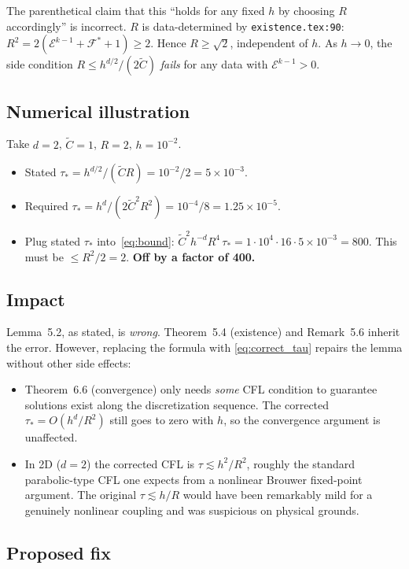 \documentclass[11pt]{article}
\newcommand{\dt}{\tau}
\newcommand{\Ctilde}{\widetilde{C}}
\begin{document}
The parenthetical claim that this ``holds for any fixed $h$ by
choosing $R$ accordingly'' is incorrect.  $R$ is data-determined by
\texttt{existence.tex:90}: $R^{2}=2(\mathcal{E}^{k-1}+\mathcal{F}^{*}+1)\ge 2$.
Hence $R\ge\sqrt{2}$, independent of $h$.  As $h\to 0$, the side
condition $R\le h^{d/2}/(2\Ctilde)$ \emph{fails} for any data with
$\mathcal{E}^{k-1}>0$.

\subsection*{Numerical illustration}

Take $d=2$, $\Ctilde=1$, $R=2$, $h=10^{-2}$.

\begin{itemize}
\item Stated $\dt_{*}=h^{d/2}/(\Ctilde R)=10^{-2}/2=5\times 10^{-3}$.
\item Required $\dt_{*}=h^{d}/(2\Ctilde^{2}R^{2})=10^{-4}/8=1.25\times 10^{-5}$.
\item Plug stated $\dt_{*}$ into~\eqref{eq:bound}:
\(
\Ctilde^{2}h^{-d}R^{4}\,\dt_{*} = 1\cdot 10^{4}\cdot 16\cdot 5\!\times\!10^{-3}=800.
\)
This must be $\le R^{2}/2=2$.  \textbf{Off by a factor of 400.}
\end{itemize}

\subsection*{Impact}

Lemma~5.2, as stated, is \emph{wrong}.  Theorem~5.4 (existence) and
Remark~5.6 inherit the error.  However, replacing the formula with
\eqref{eq:correct_tau} repairs the lemma without other side effects:
\begin{itemize}
\item Theorem~6.6 (convergence) only needs \emph{some} CFL condition
to guarantee solutions exist along the discretization sequence.
The corrected $\dt_{*}=O(h^{d}/R^{2})$ still goes to zero with $h$,
so the convergence argument is unaffected.
\item In 2D ($d=2$) the corrected CFL is $\dt\lesssim h^{2}/R^{2}$,
roughly the standard parabolic-type CFL one expects from a
nonlinear Brouwer fixed-point argument.  The original $\dt\lesssim
h/R$ would have been remarkably mild for a genuinely nonlinear
coupling and was suspicious on physical grounds.
\end{itemize}

\subsection*{Proposed fix}
\end{document}
